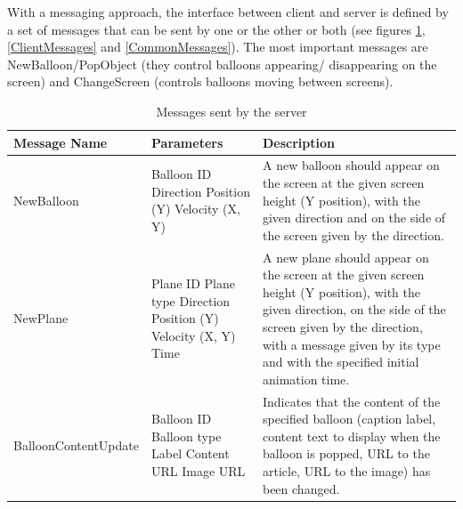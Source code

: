 With a messaging approach, the interface between client and server is defined by 
a set of messages that can be sent by one or the other or both (see figures 
\ref{ServerMessages}, \ref{ClientMessages} and \vref{CommonMessages}). The most
important messages are NewBalloon/PopObject (they control balloons appearing/
disappearing on the screen) and ChangeScreen (controls balloons moving between
screens).

\begin{table}
\begin{tabular}{|>{\raggedright}p{4.3cm}|>{\raggedright}p{2.8cm}|>{\raggedright}p{8.7cm}|}
\hline 
Message Name & Parameters & Description\tabularnewline
\hline 
NewBalloon
& Balloon ID 
\newline Direction
\newline Position (Y)
\newline Velocity (X, Y)
& A new balloon should appear on the screen at the given screen height (Y position),
with the given direction and on the side of the screen given by the direction.
\tabularnewline
\hline 
NewPlane
& Plane ID 
\newline Plane type
\newline Direction
\newline Position (Y)
\newline Velocity (X, Y)
\newline Time
& A new plane should appear on the screen at the given screen height (Y position),
with the given direction, on the side of the screen given by the direction, with
a message given by its type and with the specified initial animation time.
\tabularnewline
\hline 
BalloonContentUpdate
& Balloon ID 
\newline Balloon type
\newline Label
\newline Content
\newline URL
\newline Image URL
& Indicates that the content of the specified balloon (caption label, content
text to display when the balloon is popped, URL to the article, URL to the image) 
has been changed. 
\tabularnewline
\hline 
\end{tabular}

\caption{Messages sent by the server}

\label{ServerMessages}
\end{table}

